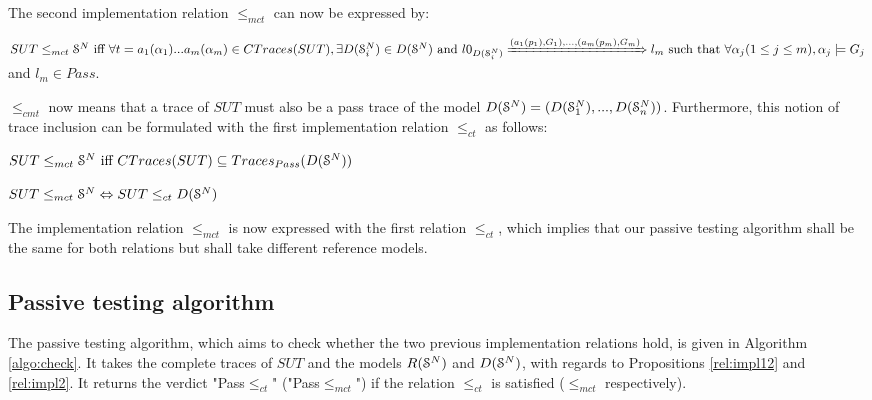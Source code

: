 The second implementation relation $\leq_{mct}$ can now be expressed by:


\begin{proposition}
    ${SUT} \leq_{mct} \EuScript{S}^{N} \text{ iff }\forall t=
    a_1(\alpha_1)...a_m(\alpha_m)\\ \in CTraces({SUT}), \exists D(\EuScript{S}_i^{N}) \in D(\EuScript{S}^{N}) \text{ and }
    l0_{D(\EuScript{S}_i^{N})}\\
    \xRightarrow{(a_1(p_1),G_{1}),...,(a_m(p_m),G_{m})} l_m \text{
    such that } \forall \alpha_j (1 \leq j \leq m), \alpha_j \models G_{j}$ and $l_m \in Pass$.
\end{proposition}


 $\leq_{cmt}$ now means that a trace of $\mathit{SUT}$ must also be a
pass trace of the model
$D(\EuScript{S}^{N})=(D(\EuScript{S}_1^{N}),...,D(\EuScript{S}_n^{N}))$. Furthermore, this notion of trace inclusion can be formulated with the first implementation relation $\leq_{ct}$ as follows:

\begin{proposition}
	\label{rel:impl2}
${SUT} \leq_{mct} \EuScript{S}^{N} \text{ iff } CTraces({SUT})\subseteq Traces_{Pass}(D(\EuScript{S}^{N}))$

${SUT} \leq_{mct} \EuScript{S}^{N}\Leftrightarrow {SUT} \leq_{ct} D(\EuScript{S}^{N})$

\end{proposition}

The implementation relation $\leq_{mct}$ is now expressed with the first
relation $\leq_{ct}$, which implies that our passive testing algorithm shall be
the same for both relations but shall take different reference models.

\subsection{Passive testing algorithm}

The passive testing algorithm, which aims to check whether the
two previous implementation relations hold, is given in Algorithm
\ref{algo:check}. It takes the complete traces of $\mathit{SUT}$ and the
models $R(\EuScript{S}^{N})$ and $D(\EuScript{S}^{N})$, with
regards to Propositions \ref{rel:impl12} and \ref{rel:impl2}. It
returns the verdict "Pass$\leq_{ct}$" ("Pass$\leq_{mct}$") if the
relation $\leq_{ct}$ is satisfied ($\leq_{mct}$ respectively).


